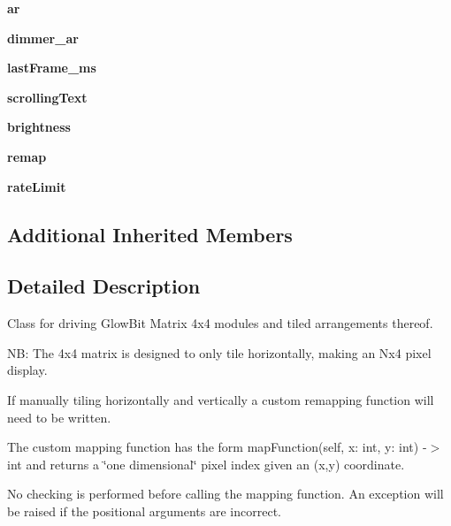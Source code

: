 \begin{DoxyCompactItemize}
{\bfseries ar}
\item 
\mbox{\label{classglowbit_1_1matrix4x4_a1adfc56eb47b5bfc5d3102efaeb38097}} 
{\bfseries dimmer\+\_\+ar}
\item 
\mbox{\label{classglowbit_1_1matrix4x4_afc755575c2642804d5c6eac170723064}} 
{\bfseries last\+Frame\+\_\+ms}
\item 
\mbox{\label{classglowbit_1_1matrix4x4_a60001cda5a86c8d035838f528e3428dc}} 
{\bfseries scrolling\+Text}
\item 
\mbox{\label{classglowbit_1_1matrix4x4_aaa175c98bbdcb35a83dd59192ee0686f}} 
{\bfseries brightness}
\item 
\mbox{\label{classglowbit_1_1matrix4x4_a8d2971111428adb5e6ed35b6f07b63de}} 
{\bfseries remap}
\item 
\mbox{\label{classglowbit_1_1matrix4x4_acfc0f73dcf2d58bb48aec88b6fc0eb33}} 
{\bfseries rate\+Limit}
\end{DoxyCompactItemize}
\subsection*{Additional Inherited Members}


\subsection{Detailed Description}
Class for driving Glow\+Bit Matrix 4x4 modules and tiled arrangements thereof. 

NB\+: The 4x4 matrix is designed to only tile horizontally, making an Nx4 pixel display.

If manually tiling horizontally and vertically a custom remapping function will need to be written.

The custom mapping function has the form map\+Function(self, x\+: int, y\+: int) -\/$>$ int and returns a \char`\"{}one dimensional\char`\"{} pixel index given an (x,y) coordinate.

No checking is performed before calling the mapping function. An exception will be raised if the positional arguments are incorrect. 

